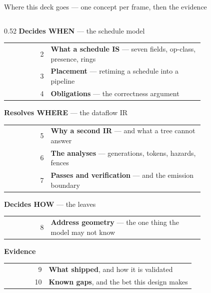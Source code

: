 \documentclass[aspectratio=169,9pt]{beamer}
\newcommand{\tsub}[1]{{\footnotesize\color{gray}#1}}
\begin{document}
\begin{frame}{Where this deck goes --- one concept per frame, then the evidence}
\vspace{-1mm}
\begin{columns}[T,onlytextwidth]
\begin{column}{0.52\textwidth}
\textbf{\color{acc}Decides WHEN} \tsub{— the schedule model}\\[1mm]
{\scriptsize
\begin{tabular}{@{}rp{0.78\linewidth}@{}}
\tsub{2} & \textbf{What a schedule IS} — seven fields, op-class, presence, rings\\
\tsub{3} & \textbf{Placement} — retiming a schedule into a pipeline\\
\tsub{4} & \textbf{Obligations} — the correctness argument\\
\end{tabular}}

\vspace{2.5mm}
\textbf{\color{acc}Resolves WHERE} \tsub{— the dataflow IR}\\[1mm]
{\scriptsize
\begin{tabular}{@{}rp{0.78\linewidth}@{}}
\tsub{5} & \textbf{Why a second IR} — and what a tree cannot answer\\
\tsub{6} & \textbf{The analyses} — generations, tokens, hazards, fences\\
\tsub{7} & \textbf{Passes and verification} — and the emission boundary\\
\end{tabular}}

\vspace{2.5mm}
\textbf{\color{acc}Decides HOW} \tsub{— the leaves}\\[1mm]
{\scriptsize
\begin{tabular}{@{}rp{0.78\linewidth}@{}}
\tsub{8} & \textbf{Address geometry} — the one thing the model may not know\\
\end{tabular}}

\vspace{2.5mm}
\textbf{\color{acc}Evidence}\\[1mm]
{\scriptsize
\begin{tabular}{@{}rp{0.78\linewidth}@{}}
\tsub{9} & \textbf{What shipped}, and how it is validated\\
\tsub{10} & \textbf{Known gaps}, and the bet this design makes\\
\end{tabular}}
\end{column}


\end{columns}
\end{frame}
\end{document}
